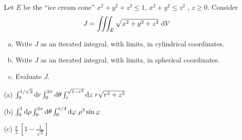\begin{question}[M200 2011A] %
Let $E$ be the ``ice cream cone'' $x^2 + y^2 + z^2 \le 1$, 
$x^2 + y^2 \le z^2$ , $z \ge 0$. Consider
\begin{equation*}
J =\tripInt_E \sqrt{x^2+y^2+z^2}\ \dee{V}
\end{equation*}
\begin{enumerate}[(a)]
\item
Write $J$ as an iterated integral, with limits, in cylindrical coordinates.
\item
Write $J$ as an iterated integral, with limits, in spherical coordinates.
\item
Evaluate $J$.
\end{enumerate}
\end{question}

%

\begin{answer}
(a) $\int_0^{1/\sqrt{2}}\mathrm{d}r\int_0^{2\pi}\mathrm{d}\theta
           \int_r^{\sqrt{1-r^2}}\mathrm{d}z\ r\sqrt{r^2+z^2}$

(b) $\int_0^{1}\mathrm{d}\rho\int_0^{2\pi}\mathrm{d}\theta
           \int_0^{\pi/4}\mathrm{d}\varphi\ \rho^3\sin\varphi$

(c) $\frac{\pi}{2}\ \left[1-\frac{1}{\sqrt{2}}\right]$
\end{answer}

